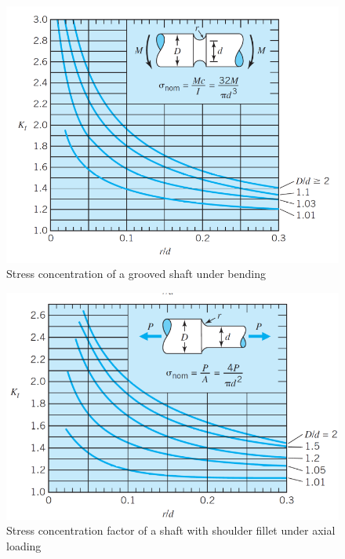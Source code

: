 \documentclass[
10pt,
a4paper,
openany,
svgnames,
]{book}
\begin{document}
\begin{figure}[H]
  \centering
  \includegraphics[scale=0.50]{pictures/Static-body-load-analysis/stress-conc-grooved-shaft}
  \caption{Stress concentration of a grooved shaft under bending \cite{juvinall2006fundamentals}}
  \label{fig: stress concentration of grooved shaft}
\end{figure}

\begin{figure}[H]
  \centering
  \includegraphics[scale=0.50]{pictures/Static-body-load-analysis/stress-conc-shaft-shoulder-fillet}
  \caption{Stress concentration factor of a shaft with shoulder fillet under axial loading \cite{juvinall2006fundamentals}}
  \label{fig: stress concentration of shaft with fillet}
\end{figure}
\end{document}
